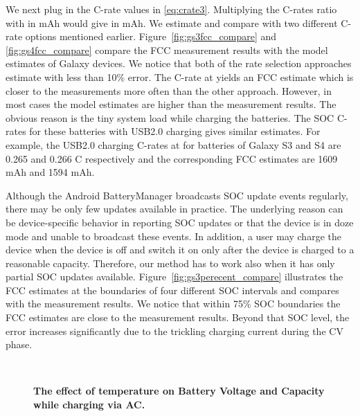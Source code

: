 \documentclass[journal]{IEEEtran}
\begin{document}
We next plug in the C-rate values in \eqref{eq:crate3}. Multiplying the C-rates ratio  with  in mAh would give  in mAh. We estimate and compare  with two different C-rate options mentioned earlier. Figure~\ref{fig:gs3fcc_compare} and \ref{fig:gs4fcc_compare} compare the FCC measurement results with the model estimates of Galaxy devices.  We notice that both of the rate selection approaches estimate  with less than 10\% error. The C-rate at  yields an FCC estimate which is closer to the measurements more often than the other approach. However, in most cases the model estimates are higher than the measurement results. The obvious reason is the tiny system load while charging the batteries. The SOC C-rates for these batteries with USB2.0 charging gives similar estimates. For example, the USB2.0 charging C-rates at  for  batteries of Galaxy S3 and S4 are 0.265 and 0.266 C  respectively and the corresponding FCC estimates are 1609 mAh and 1594 mAh.








Although the Android BatteryManager broadcasts SOC update events regularly, there may be only few updates available in practice. The underlying reason can be device-specific behavior in reporting SOC updates or that the device is in doze mode and unable to broadcast these events. In addition, a user may charge the device when the device is off and switch it on only after the device is charged to a reasonable capacity. Therefore, our method has to work also when it has only partial SOC updates available. Figure~\ref{fig:gs3perecent_compare} illustrates the FCC estimates at the boundaries of four different SOC intervals and compares with the measurement results. We notice that within 75\% SOC boundaries the FCC estimates are close to the measurement results. Beyond that SOC level, the error increases significantly due to the trickling charging current during the CV phase. 





\begin{figure}[t]
  \begin{center}
  \\
\caption{{\bf The effect of temperature on Battery Voltage and Capacity while charging via AC. }}
\label{fig:temp_charging}
 \end{center}
 \end{figure}
\end{document}
